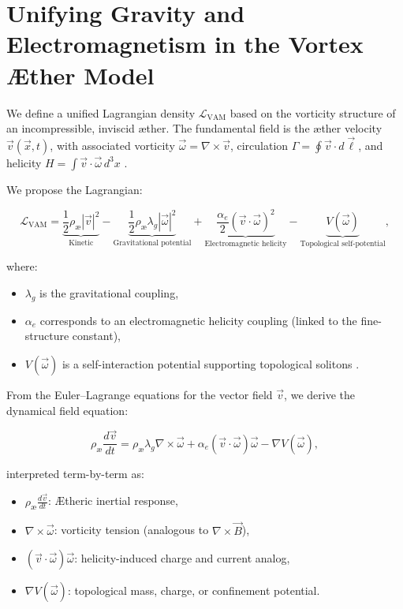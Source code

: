 \section{Unifying Gravity and Electromagnetism in the Vortex Æther Model}

We define a unified Lagrangian density $\mathcal{L}_\text{VAM}$ based on the vorticity structure of an incompressible, inviscid æther. The fundamental field is the æther velocity $\vec{v}(\vec{x}, t)$, with associated vorticity $\vec{\omega} = \nabla \times \vec{v}$, circulation $\Gamma = \oint \vec{v} \cdot d\vec{\ell}$, and helicity $H = \int \vec{v} \cdot \vec{\omega} \, d^3x$ \cite{moffatt1969degree,arnold1998topological}.

We propose the Lagrangian:

\begin{equation}
\label{eq:L_VAM}
\mathcal{L}_\text{VAM} =
\underbrace{\frac{1}{2} \rho_\text{\ae} |\vec{v}|^2}_{\text{Kinetic}} -
\underbrace{\frac{1}{2} \rho_\text{\ae} \lambda_g |\vec{\omega}|^2}_{\text{Gravitational potential}} +
\underbrace{\frac{\alpha_e}{2} (\vec{v} \cdot \vec{\omega})^2}_{\text{Electromagnetic helicity}} -
\underbrace{V(\vec{\omega})}_{\text{Topological self-potential}},
\end{equation}

where:
\begin{itemize}
    \item $\lambda_g$ is the gravitational coupling,
    \item $\alpha_e$ corresponds to an electromagnetic helicity coupling (linked to the fine-structure constant),
    \item $V(\vec{\omega})$ is a self-interaction potential supporting topological solitons \cite{faddeev1997stable,babaev2002knotted}.
\end{itemize}

From the Euler--Lagrange equations for the vector field $\vec{v}$, we derive the dynamical field equation:

\begin{equation}
\label{eq:VAM_dynamics}
\rho_\text{\ae} \frac{d \vec{v}}{dt} =
\rho_\text{\ae} \lambda_g \nabla \times \vec{\omega}
+ \alpha_e (\vec{v} \cdot \vec{\omega}) \vec{\omega}
- \nabla V(\vec{\omega}),
\end{equation}

interpreted term-by-term as:
\begin{itemize}
    \item $\rho_\text{\ae} \frac{d \vec{v}}{dt}$: Ætheric inertial response,
    \item $\nabla \times \vec{\omega}$: vorticity tension (analogous to $\nabla \times \vec{B}$),
    \item $(\vec{v} \cdot \vec{\omega}) \vec{\omega}$: helicity-induced charge and current analog,
    \item $\nabla V(\vec{\omega})$: topological mass, charge, or confinement potential.
\end{itemize}

